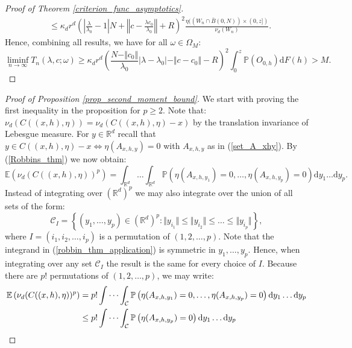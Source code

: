 \documentclass{article}
\newcommand{\RR}{\mathbb{R}}
\newcommand{\PP}{\mathbb{P}}
\newcommand{\EE}{\mathbb{E}}
\theoremstyle{plain}
\theoremstyle{remark}
\theoremstyle{definition}
\begin{document}
\begin{proof}[Proof of Theorem \ref{criterion_func_asymptotics}]
\begin{align*}
        &\leq \kappa_d r^d \left(\left|\frac{\lambda}{\lambda_0} - 1 \right|N + \left\Vert c - \frac{\lambda c_0}{\lambda_0} \right\Vert + R \right)^2 \frac{\eta((W_n \cap \bar{B}(0,N))\times(0,z])}{\nu_d(W_n)}.
    \end{align*}
    Hence, combining all results, we have for all $\omega \in \Omega_M$:
    \[\liminf_{n \to \infty} T_n(\lambda,c;\omega) \geq \kappa_d r^d\left(\frac{N - \Vert c_0 \Vert}{\lambda_0}\left|\lambda-\lambda_0 \right| - \Vert c - c_0 \Vert - R \right)^2 \int_0^z \PP(O_{0,h})\mathrm{d}F(h) > M.\]
\end{proof}


\begin{proof}[Proof of Proposition \ref{prop_second_moment_bound}]
    We start with proving the first inequality in the proposition for $p \geq 2$. Note that: $\nu_d(C((x,h),\eta)) = \nu_d(C((x,h),\eta)-x)$ by the translation invariance of Lebesgue measure. For $y \in \RR^d$ recall that $y \in C((x,h),\eta)-x \iff \eta(A_{x,h,y}) = 0$ with $A_{x,h,y}$ as in (\ref{set_A_xhy}). By (\ref{Robbins_thm}) we now obtain:
    \begin{equation}
        \EE\left(\nu_d(C((x,h),\eta))^p\right) = \int_{\RR^d}\dots\int_{\RR^d}\PP\left(\eta(A_{x,h,y_1}) = 0,\dots, \eta(A_{x,h,y_p}) = 0\right)\mathrm{d}y_1 \dots\mathrm{d}y_p.\label{robbin_thm_application}
    \end{equation}
    Instead of integrating over $(\RR^d)^p$ we may also integrate over the union of all sets of the form:
    \begin{equation*}
        \mathcal{C}_I =\left\{(y_1,\dots,y_p) \in (\RR^d)^p: \Vert y_{i_1} \Vert \leq \Vert y_{i_2}\Vert \leq \dots \leq \Vert y_{i_p} \Vert  \right\},
    \end{equation*}
    where $I =(i_1,i_2,\dots,i_p)$ is a permutation of $(1,2,\dots,p)$. Note that the integrand in (\ref{robbin_thm_application}) is symmetric in $y_1,\dots,y_p$. Hence, when integrating over any set $\mathcal{C}_I$ the result is the same for every choice of $I$. Because there are $p!$ permutations of $(1,2,\dots,p)$, we may write:
    \begin{align}
        \EE\left(\nu_d(C((x,h),\eta))^p\right)  &=p!\idotsint_\mathcal{C}\PP\left(\eta(A_{x,h,y_1}) = 0,\dots, \eta(A_{x,h,y_p}) = 0\right)\mathrm{d}y_1 \dots\mathrm{d}y_p \nonumber \\
        &\leq p!\idotsint_\mathcal{C}\PP\left(\eta(A_{x,h,y_p}) = 0\right)\mathrm{d}y_1 \dots\mathrm{d}y_p \nonumber \\ 

\end{align}
\end{proof}
\end{document}
